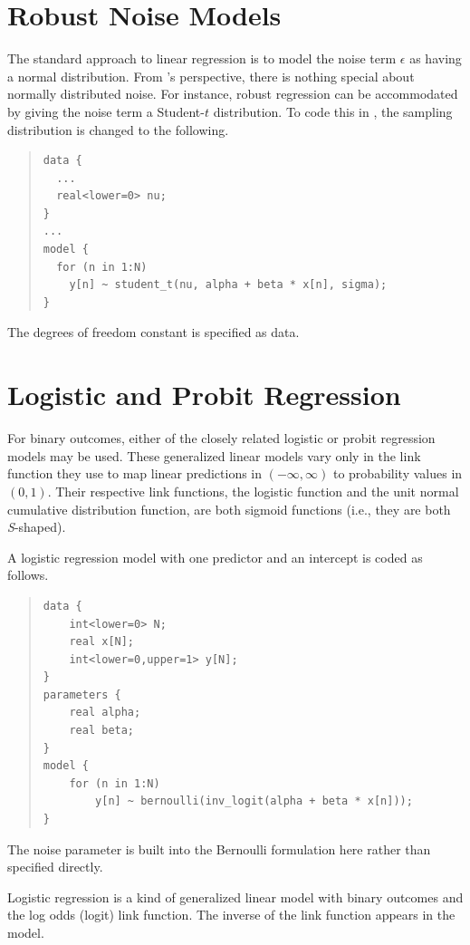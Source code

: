 \section{Robust Noise Models}

The standard approach to linear regression is to model the noise
term $\epsilon$ as having a normal distribution.  From \Stan's
perspective, there is nothing special about normally distributed
noise.  For instance, robust regression can be accommodated by giving
the noise term a Student-$t$ distribution.  To code this in \Stan, the
sampling distribution is changed to the following.
%
\begin{quote}
\begin{Verbatim}
data {
  ...
  real<lower=0> nu;
}
...
model {
  for (n in 1:N)
    y[n] ~ student_t(nu, alpha + beta * x[n], sigma);
}
\end{Verbatim}
\end{quote}
%
The degrees of freedom constant  is specified as data.

\section{Logistic and Probit Regression}\label{logistic-probit-regression.section}

For binary outcomes, either of the closely related logistic or probit
regression models may be used.  These generalized linear models vary
only in the link function they use to map linear predictions in
$(-\infty,\infty)$ to probability values in $(0,1)$.  Their respective
link functions, the logistic function and the unit normal cumulative distribution
function, are both sigmoid functions (i.e., they are both {\it S}-shaped).

A logistic regression model with one predictor and an intercept is coded as
follows.
%
\begin{quote}
\begin{Verbatim}
data {
    int<lower=0> N;
    real x[N];
    int<lower=0,upper=1> y[N];
}
parameters {
    real alpha;
    real beta;
}
model {
    for (n in 1:N)
        y[n] ~ bernoulli(inv_logit(alpha + beta * x[n]));
} 
\end{Verbatim}
\end{quote}
%
The noise parameter is built into the Bernoulli formulation here
rather than specified directly.

Logistic regression is a kind of generalized linear model with binary
outcomes and the log odds (logit) link function.  The inverse of the
link function appears in the model.  

